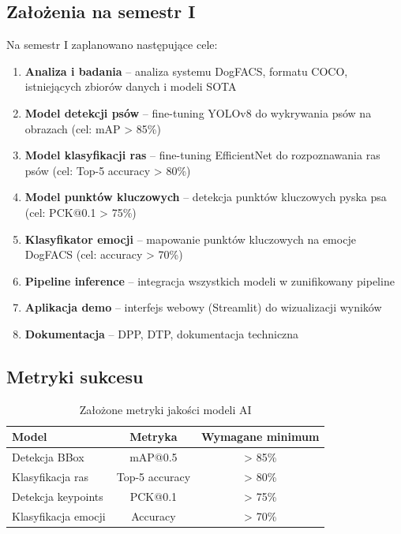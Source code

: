 \documentclass[12pt,a4paper]{article}
\begin{document}
\subsection{Założenia na semestr I}

Na semestr I zaplanowano następujące cele:

\begin{enumerate}[leftmargin=2cm]
    \item \textbf{Analiza i badania} -- analiza systemu DogFACS, formatu COCO, istniejących zbiorów danych i modeli SOTA
    \item \textbf{Model detekcji psów} -- fine-tuning YOLOv8 do wykrywania psów na obrazach (cel: mAP > 85\%)
    \item \textbf{Model klasyfikacji ras} -- fine-tuning EfficientNet do rozpoznawania ras psów (cel: Top-5 accuracy > 80\%)
    \item \textbf{Model punktów kluczowych} -- detekcja punktów kluczowych pyska psa (cel: PCK@0.1 > 75\%)
    \item \textbf{Klasyfikator emocji} -- mapowanie punktów kluczowych na emocje DogFACS (cel: accuracy > 70\%)
    \item \textbf{Pipeline inference} -- integracja wszystkich modeli w zunifikowany pipeline
    \item \textbf{Aplikacja demo} -- interfejs webowy (Streamlit) do wizualizacji wyników
    \item \textbf{Dokumentacja} -- DPP, DTP, dokumentacja techniczna
\end{enumerate}

\subsection{Metryki sukcesu}

\begin{table}[h]
\centering
\begin{tabular}{lcc}
\toprule
\textbf{Model} & \textbf{Metryka} & \textbf{Wymagane minimum} \\
\midrule
Detekcja BBox & mAP@0.5 & > 85\% \\
Klasyfikacja ras & Top-5 accuracy & > 80\% \\
Detekcja keypoints & PCK@0.1 & > 75\% \\
Klasyfikacja emocji & Accuracy & > 70\% \\
\bottomrule
\end{tabular}
\caption{Założone metryki jakości modeli AI}
\end{table}
\end{document}
